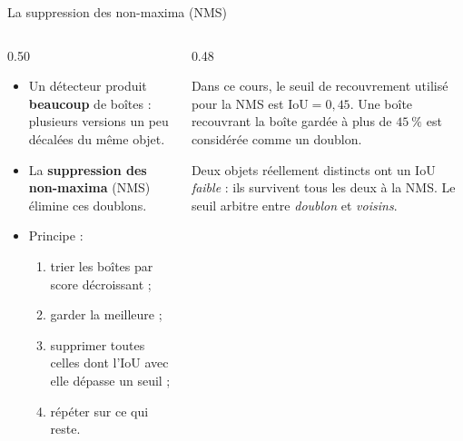 \begin{frame}{La suppression des non-maxima (NMS)}
\begin{columns}[t]
\begin{column}{0.50\textwidth}
\begin{itemize}
  \item Un détecteur produit \textbf{beaucoup} de boîtes : plusieurs versions
  un peu décalées du même objet.
  \item La \textbf{suppression des non-maxima} (NMS) élimine ces doublons.
  \item Principe :
  \begin{enumerate}
    \item trier les boîtes par score décroissant ;
    \item garder la meilleure ;
    \item supprimer toutes celles dont l'IoU avec elle dépasse un seuil ;
    \item répéter sur ce qui reste.
  \end{enumerate}
\end{itemize}
\end{column}
\begin{column}{0.48\textwidth}
\begin{kbox}
Dans ce cours, le seuil de recouvrement utilisé pour la NMS est
$\mathrm{IoU} = 0{,}45$. Une boîte recouvrant la boîte gardée à plus de
$45 \ \%$ est considérée comme un doublon.
\end{kbox}
\begin{wbox}
Deux objets réellement distincts ont un IoU \emph{faible} : ils survivent
tous les deux à la NMS. Le seuil arbitre entre \emph{doublon} et \emph{voisins}.
\end{wbox}
\end{column}
\end{columns}
\end{frame}

